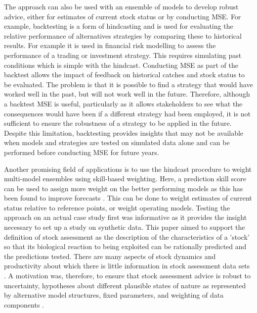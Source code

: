 \documentclass[12pt,halfline,a4paper,nonumbib]{ouparticle}
\begin{document}
The approach can also be used with an ensemble of models to develop robust advice, either for estimates of current stock status or by conducting MSE. For example, backtesting is a form of hindcasting and is used for evaluating the relative performance of alternatives strategies by comparing these to historical results. For example it is used in financial risk modelling to assess the performance of a trading or investment strategy. This requires simulating past conditions which is simple with the hindcast. Conducting MSE as part of the backtest allows the impact of feedback on historical catches and stock status to be evaluated. The problem is that it is possible to find a strategy that would have worked well in the past, but will not work well in the future. Therefore, although a backtest MSE is useful, particularly as it allows stakeholders to see what the consequences would have been if a different strategy had been employed, it is not sufficient to ensure the robustness of a strategy to be applied in the future. Despite this limitation, backtesting provides insights that may not be available when models and strategies are tested on simulated data alone and can be performed before conducting MSE for future years.

Another promising field of applications is to use the hindcast procedure to weight multi-model ensembles using skill-based weighting. Here, a prediction skill score can be used to assign more weight on the better performing models as this has been found to improve forecasts \parencite[e.g.][]{casanova2009weighting}. This can be done to weight estimates of current status relative to reference points, or weight operating models. Testing the approach on an actual case study first was informative as it provides the insight necessary to set up a study on synthetic data.
This paper aimed to support the definition of stock assessment as the description of the characteristics of a ’stock’ so that its biological reaction to being exploited can be rationally predicted and the predictions tested. There are many aspects of stock dynamics and productivity about which there is little information in stock assessment data sets \parencite[e.g.][]{lee2011m,lee2012steepness, jiao2012modelling,simon2012effects,mangel2013perspective,pepin2015reconsidering,cury2014resolving}. A motivation was, therefore, to ensure that stock assessment advice is robust to uncertainty, hypotheses about different plausible states of nature as represented by alternative model structures, fixed parameters, and weighting of data components \parencite[][]{sharma2020trfmo}. 
\end{document}
